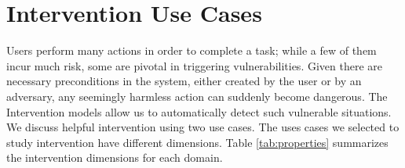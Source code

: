 \section{Intervention Use Cases}
Users perform many actions in order to complete a task; while a few of them incur much risk, some are pivotal in triggering vulnerabilities. 
Given there are necessary preconditions in the system, either created by the user or by an adversary, any seemingly harmless action can suddenly become dangerous. 
The Intervention models allow us to automatically detect such vulnerable situations.
We discuss helpful intervention using two use cases. 
The uses cases we selected to study intervention have different dimensions. 
Table \ref{tab:properties} summarizes the intervention dimensions for each domain.
\begin{table}[ptb]
\caption{Dimensions of intervention use cases}
\label{tab:properties}
\end{table}

